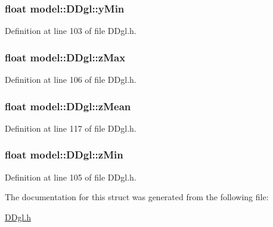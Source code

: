 \hypertarget{structmodel_1_1_d_dgl_a730ec25b5387a8c488449968af6b9d64}{}
\subsubsection[{y\+Min}]{\setlength{\rightskip}{0pt plus 5cm}float model\+::\+D\+Dgl\+::y\+Min}\label{structmodel_1_1_d_dgl_a730ec25b5387a8c488449968af6b9d64}


Definition at line 103 of file D\+Dgl.\+h.

\hypertarget{structmodel_1_1_d_dgl_a7a0d96300779762d00f269a7bd4001d8}{}
\subsubsection[{z\+Max}]{\setlength{\rightskip}{0pt plus 5cm}float model\+::\+D\+Dgl\+::z\+Max}\label{structmodel_1_1_d_dgl_a7a0d96300779762d00f269a7bd4001d8}


Definition at line 106 of file D\+Dgl.\+h.

\hypertarget{structmodel_1_1_d_dgl_a98ddb3ec25cb6bfefe0505b9a79643d4}{}
\subsubsection[{z\+Mean}]{\setlength{\rightskip}{0pt plus 5cm}float model\+::\+D\+Dgl\+::z\+Mean}\label{structmodel_1_1_d_dgl_a98ddb3ec25cb6bfefe0505b9a79643d4}


Definition at line 117 of file D\+Dgl.\+h.

\hypertarget{structmodel_1_1_d_dgl_a55e12eb67bb8dee9793469e0dec32611}{}
\subsubsection[{z\+Min}]{\setlength{\rightskip}{0pt plus 5cm}float model\+::\+D\+Dgl\+::z\+Min}\label{structmodel_1_1_d_dgl_a55e12eb67bb8dee9793469e0dec32611}


Definition at line 105 of file D\+Dgl.\+h.



The documentation for this struct was generated from the following file\+:\begin{DoxyCompactItemize}
\item 
\hyperlink{_d_dgl_8h}{D\+Dgl.\+h}\end{DoxyCompactItemize}
